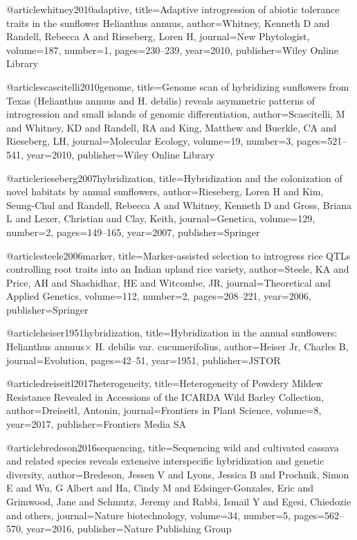@article{whitney2010adaptive,
  title={Adaptive introgression of abiotic tolerance traits in the sunflower Helianthus annuus},
  author={Whitney, Kenneth D and Randell, Rebecca A and Rieseberg, Loren H},
  journal={New Phytologist},
  volume={187},
  number={1},
  pages={230--239},
  year={2010},
  publisher={Wiley Online Library}
}

@article{scascitelli2010genome,
  title={Genome scan of hybridizing sunflowers from Texas (Helianthus annuus and H. debilis) reveals asymmetric patterns of introgression and small islands of genomic differentiation},
  author={Scascitelli, M and Whitney, KD and Randell, RA and King, Matthew and Buerkle, CA and Rieseberg, LH},
  journal={Molecular Ecology},
  volume={19},
  number={3},
  pages={521--541},
  year={2010},
  publisher={Wiley Online Library}
}

@article{rieseberg2007hybridization,
  title={Hybridization and the colonization of novel habitats by annual sunflowers},
  author={Rieseberg, Loren H and Kim, Seung-Chul and Randell, Rebecca A and Whitney, Kenneth D and Gross, Briana L and Lexer, Christian and Clay, Keith},
  journal={Genetica},
  volume={129},
  number={2},
  pages={149--165},
  year={2007},
  publisher={Springer}
}

@article{steele2006marker,
  title={Marker-assisted selection to introgress rice QTLs controlling root traits into an Indian upland rice variety},
  author={Steele, KA and Price, AH and Shashidhar, HE and Witcombe, JR},
  journal={Theoretical and Applied Genetics},
  volume={112},
  number={2},
  pages={208--221},
  year={2006},
  publisher={Springer}
}

@article{heiser1951hybridization,
  title={Hybridization in the annual sunflowers: Helianthus annuus$\times$ H. debilis var. cucumerifolius},
  author={Heiser Jr, Charles B},
  journal={Evolution},
  pages={42--51},
  year={1951},
  publisher={JSTOR}
}

@article{dreiseitl2017heterogeneity,
  title={Heterogeneity of Powdery Mildew Resistance Revealed in Accessions of the ICARDA Wild Barley Collection},
  author={Dreiseitl, Antonin},
  journal={Frontiers in Plant Science},
  volume={8},
  year={2017},
  publisher={Frontiers Media SA}
}

@article{bredeson2016sequencing,
  title={Sequencing wild and cultivated cassava and related species reveals extensive interspecific hybridization and genetic diversity},
  author={Bredeson, Jessen V and Lyons, Jessica B and Prochnik, Simon E and Wu, G Albert and Ha, Cindy M and Edsinger-Gonzales, Eric and Grimwood, Jane and Schmutz, Jeremy and Rabbi, Ismail Y and Egesi, Chiedozie and others},
  journal={Nature biotechnology},
  volume={34},
  number={5},
  pages={562--570},
  year={2016},
  publisher={Nature Publishing Group}
}

